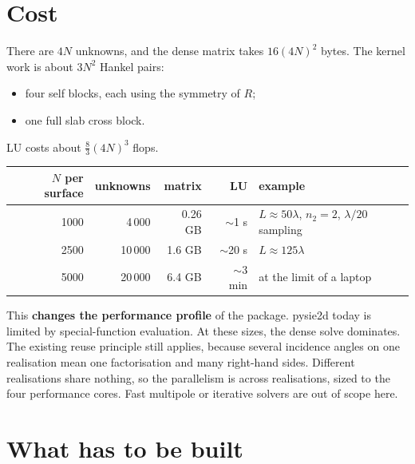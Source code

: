 \documentclass[11pt,a4paper]{article}
\begin{document}
\section{Cost}

There are $4N$ unknowns, and the dense matrix takes $16(4N)^2$ bytes. The kernel work is about $3N^2$
Hankel pairs:
\begin{itemize}
  \item four self blocks, each using the symmetry of $R$;
  \item one full slab cross block.
\end{itemize}
LU costs about $\tfrac83(4N)^3$ flops.

\begin{center}
\begin{tabular}{rrrrl}
\toprule
$N$ per surface & unknowns & matrix & LU & example \\
\midrule
1000 & 4\,000 & 0.26 GB & $\sim$1 s & $L\approx 50\lambda$, $n_2=2$, $\lambda/20$ sampling\\
2500 & 10\,000 & 1.6 GB & $\sim$20 s & $L\approx 125\lambda$\\
5000 & 20\,000 & 6.4 GB & $\sim$3 min & at the limit of a laptop\\
\bottomrule
\end{tabular}
\end{center}

This \textbf{changes the performance profile} of the package. pysie2d today is
limited by special-function evaluation. At these sizes, the dense solve dominates.
The existing reuse principle still applies, because several incidence angles on one
realisation mean one factorisation and many right-hand sides.
Different realisations share nothing, so the parallelism is across realisations,
sized to the four performance cores. Fast multipole or iterative solvers are out of scope here.

\section{What has to be built}
\end{document}
